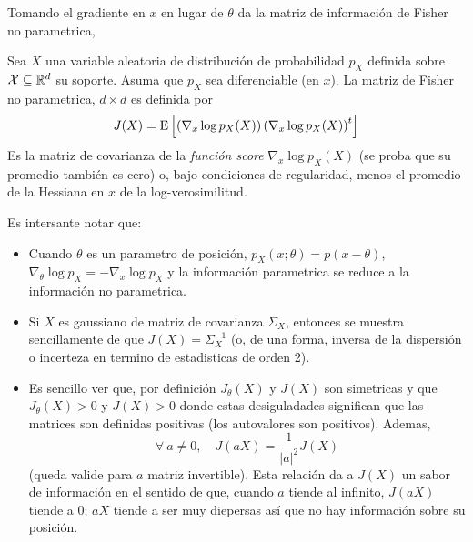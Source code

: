 Tomando el gradiente  en $x$ en lugar de $\theta$ da  la matriz de informaci\'on
de Fisher no parametrica,
%
\begin{definicion}
  Sea  $X$  una  variable  aleatoria  de distribuci\'on  de  probabilidad  $p_X$
  definida  sobre  $\mathcal{X} \subseteq  \mathbb{R}^d$  su  soporte.   Asuma que  $p_X$  sea
  diferenciable (en $x$).   La matriz de Fisher no parametrica,  $d \times d$ es
  definida por
  \[
  J(X) =  \operatorname{E}\left[ \left(  \nabla_x \log p_X(X)  \right) \left(  \nabla_x \log
      p_X(X) \right)^t \right]
  \]
  Es la matriz de covarianza de  la {\it funci\'on score} $\nabla_x \log p_X(X)$
  (se  proba  que  su  promedio  tambi\'en  es  cero)  o,  bajo  condiciones  de
  regularidad, menos el promedio de la Hessiana en $x$ de la log-verosimilitud.
\end{definicion}
%
Es intersante notar que:
%
\begin{itemize}
\item Cuando $\theta$ es un  parametro de posici\'on, $p_X(x;\theta) = p(x -
\theta)$,  $\nabla_\theta \log p_X  = -  \nabla_x \log  p_X$ y  la informaci\'on
parametrica se reduce a la informaci\'on no parametrica.
%
\item  Si $X$  es  gaussiano de  matriz  de covarianza  $\Sigma_X$, entonces  se
  muestra sencillamente de que $J(X)  = \Sigma_X^{-1}$ (o, de una forma, inversa
  de la dispersi\'on o incerteza en termino de estadisticas de orden 2).
%
\item  Es  sencillo  ver  que,  por  definici\'on  $J_\theta(X)$  y  $J(X)$  son
  simetricas y  que $J_\theta(X)  > 0$  y $J(X) >  0$ donde  estas desiguladades
  significan  que las  matrices  son definidas  positivas  (los autovalores  son
  positivos).  Ademas,
  \[
  \forall \ a \ne 0, \quad J(aX) = \frac{1}{|a|^2} J(X)
  \]
  (queda valide  para $a$  matriz invertible).  Esta  relaci\'on da a  $J(X)$ un
  sabor de  informaci\'on en el sentido  de que, cuando $a$  tiende al infinito,
  $J(aX)$  tiende a  0;  $a X$  tiende  a ser  muy diepersas  as\'i  que no  hay
  informaci\'on sobre su posici\'on.
\end{itemize}


